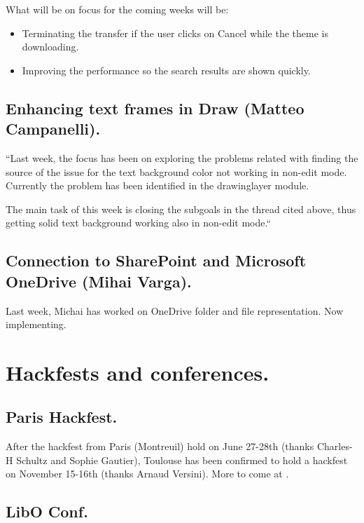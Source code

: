 \documentclass{article}
\begin{document}
What will be on focus for the coming weeks will be:
\begin{itemize}
    \item Terminating the transfer if the user clicks on Cancel while the theme is downloading.
    \item Improving the performance so the search results are shown quickly.
\end{itemize}

\subsection{Enhancing text frames in Draw (Matteo Campanelli).}

``Last week, the focus has been on exploring the problems related with finding the source of the issue for the text background color not working in non-edit mode.
Currently the problem has been identified in the drawinglayer module\cite{gsocTextFrameDrawMl}.

The main task of this week is closing the subgoals in the thread cited above, thus getting solid text background working also in non-edit mode.``\cite{gsocTextFrameDraw}

\subsection{Connection to SharePoint and Microsoft OneDrive (Mihai Varga).}

Last week, Michai has worked on OneDrive folder and file representation. Now implementing.\cite{gsocOneDrive}



\section{Hackfests and conferences.}

\subsection{Paris Hackfest.}

After the hackfest from Paris (Montreuil) hold on June 27-28th (thanks
Charles-H Schultz and Sophie Gautier), Toulouse has been confirmed to hold
a hackfest on November 15-16th\cite{hackfestToulouse} (thanks Arnaud Versini).
More to come at \cite{hackfestToulouseWiki}.

\subsection{LibO Conf.}
\end{document}
